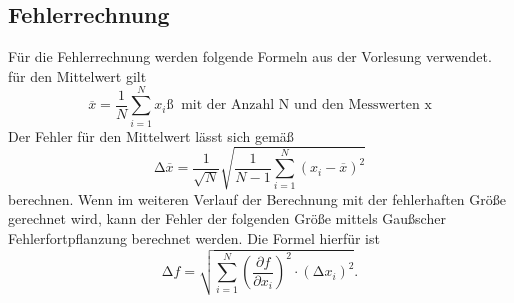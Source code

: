 \subsection{Fehlerrechnung}
\label{sec:Fehlerrechnung}
Für die Fehlerrechnung werden folgende Formeln aus der Vorlesung verwendet.
für den Mittelwert gilt
\begin{equation}
    \overline{x}=\frac{1}{N}\sum_{i=1}^N x_i ß\; \;\text{mit der Anzahl N und den Messwerten x} 
    \label{eqn:Mittelwert}
\end{equation}
Der Fehler für den Mittelwert lässt sich gemäß
\begin{equation}
    \increment \overline{x}=\frac{1}{\sqrt{N}}\sqrt{\frac{1}{N-1}\sum_{i=1}^N(x_i-\overline{x})^2}
    \label{eqn:FehlerMittelwert}
\end{equation}
berechnen.
Wenn im weiteren Verlauf der Berechnung mit der fehlerhaften Größe gerechnet wird, kann der Fehler der folgenden Größe
mittels Gaußscher Fehlerfortpflanzung berechnet werden. Die Formel hierfür ist
\begin{equation}
    \increment f= \sqrt{\sum_{i=1}^N\left(\frac{\partial f}{\partial x_i}\right)^2\cdot(\increment x_i)^2}.
    \label{eqn:GaussMittelwert}
\end{equation}